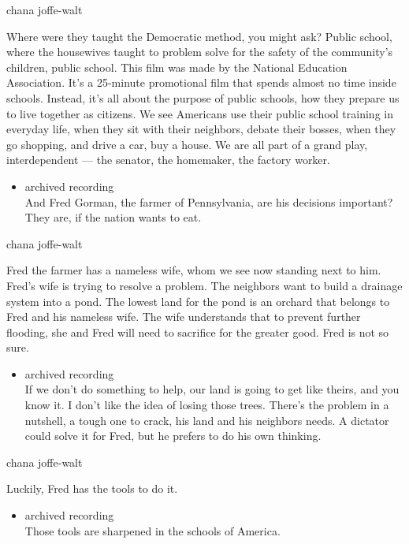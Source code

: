 chana joffe-walt

Where were they taught the Democratic method, you might ask? Public
school, where the housewives taught to problem solve for the safety of
the community's children, public school. This film was made by the
National Education Association. It's a 25-minute promotional film that
spends almost no time inside schools. Instead, it's all about the
purpose of public schools, how they prepare us to live together as
citizens. We see Americans use their public school training in everyday
life, when they sit with their neighbors, debate their bosses, when they
go shopping, and drive a car, buy a house. We are all part of a grand
play, interdependent --- the senator, the homemaker, the factory worker.

\begin{itemize}
\tightlist
\item
  archived recording\\
  And Fred Gorman, the farmer of Pennsylvania, are his decisions
  important? They are, if the nation wants to eat.
\end{itemize}

chana joffe-walt

Fred the farmer has a nameless wife, whom we see now standing next to
him. Fred's wife is trying to resolve a problem. The neighbors want to
build a drainage system into a pond. The lowest land for the pond is an
orchard that belongs to Fred and his nameless wife. The wife understands
that to prevent further flooding, she and Fred will need to sacrifice
for the greater good. Fred is not so sure.

\begin{itemize}
\tightlist
\item
  archived recording\\
  If we don't do something to help, our land is going to get like
  theirs, and you know it. I don't like the idea of losing those trees.
  There's the problem in a nutshell, a tough one to crack, his land and
  his neighbors needs. A dictator could solve it for Fred, but he
  prefers to do his own thinking.
\end{itemize}

chana joffe-walt

Luckily, Fred has the tools to do it.

\begin{itemize}
\tightlist
\item
  archived recording\\
  Those tools are sharpened in the schools of America.
\end{itemize}

